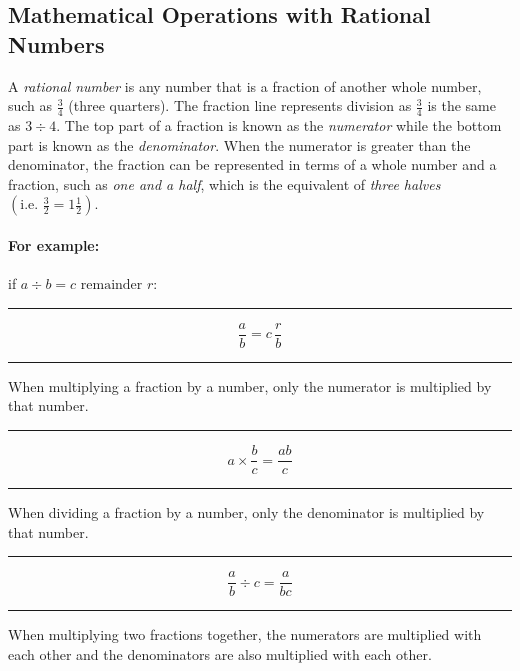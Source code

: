 \documentclass[a5paper,9pt]{book}
\theoremstyle{definition}
\newcommand{\eqlinesur}[1]{%
    \vspace*{\baselineskip}

    \hrule%

    \vspace*{\medskipamount}

    #1

    \vspace*{\medskipamount-0.5\belowdisplayskip}

    \hrule%

    \vspace*{\baselineskip}
}
\begin{document}
                \subsection{Mathematical Operations with Rational Numbers}

                A \emph{rational number} is any number that is a fraction of another
                whole number, such as $\frac{3}{4}$ (three quarters). The fraction line
                represents division as $\frac{3}{4}$ is the same as $3\div 4$. The top
                part of a fraction is known as the \emph{numerator} while the bottom
                part is known as the \emph{denominator}. When the numerator is greater
                than the denominator, the fraction can be represented in terms of a whole
                number and a fraction, such as \emph{one and a half}, which is the equivalent of
                \emph{three halves} $\left(\text{i.e.\ }\frac{3}{2} = 1\frac{1}{2}\right)$.

                \paragraph{For example:} if $a\div b = c \text{ remainder } r$:

                \eqlinesur{%
                    \begin{equation*}
                        \frac{a}{b} = c\,\frac{r}{b}
                    \end{equation*}
                }

                When multiplying a fraction by a number, only the numerator is multiplied
                by that number.

                \eqlinesur{%
                    \begin{equation*}
                        a \times \frac{b}{c} = \frac{ab}{c}
                    \end{equation*}
                }

                When dividing a fraction by a number, only the denominator is multiplied by
                that number.

                \eqlinesur{%
                    \begin{equation*}
                        \frac{a}{b}\div c = \frac{a}{bc}
                    \end{equation*}
                }

                When multiplying two fractions together, the numerators are multiplied
                with each other and the denominators are also multiplied with each other.
\end{document}
